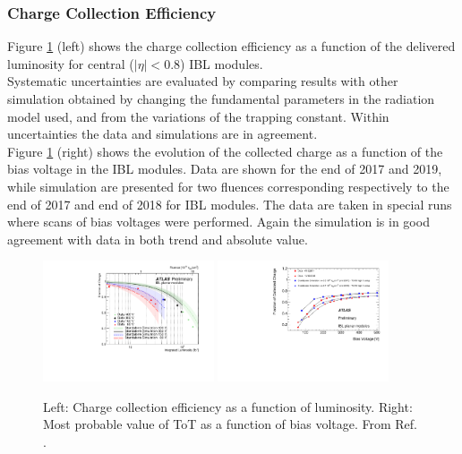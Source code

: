 \subsubsection{Charge Collection Efficiency}
Figure \ref{fig:CCELumi} (left) shows the charge collection efficiency as a function of the delivered luminosity for central ($|\eta|< 0.8$) IBL modules.\\
Systematic uncertainties are evaluated by comparing results with other simulation obtained by changing the fundamental parameters in the radiation model used, and from the variations of the trapping constant. Within uncertainties the data and simulations are in agreement.\\
Figure \ref{fig:CCELumi} (right) shows the evolution of the collected charge as a function of the bias voltage in the IBL modules. Data are shown for the end of 2017 and 2019, while simulation are presented for two fluences corresponding respectively to the end of 2017 and end of 2018 for IBL modules. The data are taken in special runs where scans of bias voltages were performed. Again the simulation is in good agreement with data in both trend and absolute value.


\begin{figure}[!htb]
\centering
\includegraphics[width=0.45\textwidth]{figures/SensorSimulation/fig_04.pdf}
\includegraphics[width=0.45\textwidth]{figures/SensorSimulation/fig_05.pdf}
\caption{Left: Charge collection efficiency as a function of luminosity. Right: Most probable value of ToT as a function of bias voltage. From Ref. \cite{ATLAS:PlotCCE}.}
\label{fig:CCELumi}
\end{figure}

